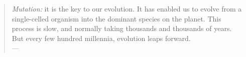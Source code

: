 \thispagestyle{empty}
\null
\vfill
\begin{quote}
	\emph{Mutation:} it is the key to our evolution. It has enabled us to evolve
	from a single-celled organism into the dominant species on the planet. This
	process is slow, and normally taking thousands and thousands of years. But
	every few hundred millennia, evolution leaps forward.\\
	\null\hfill--- \citet{singer2000}
\end{quote}

